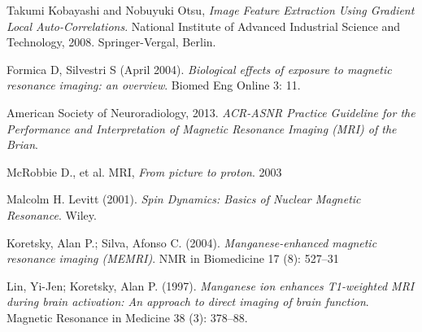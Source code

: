 \documentclass[a4paper,12pt]{article}
\begin{document}
\begin{thebibliography}{9}
Takumi Kobayashi and Nobuyuki Otsu, {\em Image Feature Extraction Using Gradient Local Auto-Correlations}. National Institute of Advanced Industrial Science and Technology, 2008. Springer-Vergal, Berlin.

Formica D, Silvestri S (April 2004). {\em Biological effects of exposure to magnetic resonance imaging: an overview}. Biomed Eng Online 3: 11. 

American Society of Neuroradiology, 2013. {\em ACR-ASNR Practice Guideline for the Performance and Interpretation of Magnetic Resonance Imaging (MRI) of the Brian}.

McRobbie D., et al. MRI, {\em From picture to proton}. 2003

Malcolm H. Levitt (2001). {\em Spin Dynamics: Basics of Nuclear Magnetic Resonance}. Wiley.

Koretsky, Alan P.; Silva, Afonso C. (2004). {\em Manganese-enhanced magnetic resonance imaging (MEMRI)}. NMR in Biomedicine 17 (8): 527–31

Lin, Yi-Jen; Koretsky, Alan P. (1997). {\em Manganese ion enhances T1-weighted MRI during brain activation: An approach to direct imaging of brain function}. Magnetic Resonance in Medicine 38 (3): 378–88.









\end{thebibliography}
\end{document}
